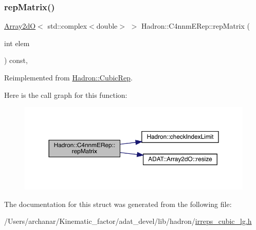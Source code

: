 \subsubsection{\texorpdfstring{repMatrix()}{repMatrix()}\hspace{0.1cm}{\footnotesize\ttfamily [2/2]}}
{\footnotesize\ttfamily \mbox{\hyperlink{classADAT_1_1Array2dO}{Array2dO}}$<$ std\+::complex$<$double$>$ $>$ Hadron\+::\+C4nnm\+E\+Rep\+::rep\+Matrix (\begin{DoxyParamCaption}\item[{int}]{elem }\end{DoxyParamCaption}) const\hspace{0.3cm}{\ttfamily [inline]}, {\ttfamily [virtual]}}



Reimplemented from \mbox{\hyperlink{structHadron_1_1CubicRep_ac5d7e9e6f4ab1158b5fce3e4ad9e8005}{Hadron\+::\+Cubic\+Rep}}.

Here is the call graph for this function\+:
\nopagebreak
\begin{figure}[H]
\begin{center}
\leavevmode
\includegraphics[width=350pt]{dc/d30/structHadron_1_1C4nnmERep_adb5804895fb825dd5a5fde9c417e5cb8_cgraph}
\end{center}
\end{figure}


The documentation for this struct was generated from the following file\+:\begin{DoxyCompactItemize}
\item 
/\+Users/archanar/\+Kinematic\+\_\+factor/adat\+\_\+devel/lib/hadron/\mbox{\hyperlink{lib_2hadron_2irreps__cubic__lg_8h}{irreps\+\_\+cubic\+\_\+lg.\+h}}\end{DoxyCompactItemize}
